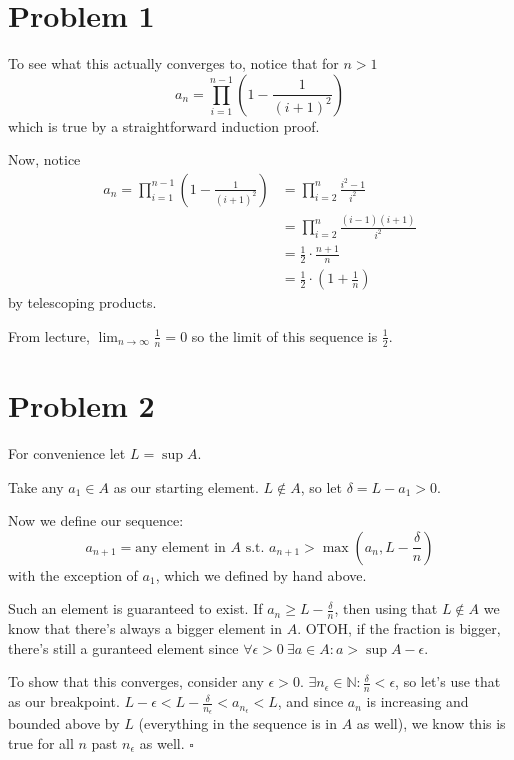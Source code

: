 \documentclass[12pt]{article}
\newcommand{\N}{\mathbb{N}}
\begin{document}
\section{Problem 1}

To see what this actually converges to, notice that for $n > 1$
\[a_n = \prod_{i=1}^{n-1} \left(1-\frac{1}{(i+1)^2}\right)\]
which is true by a straightforward induction proof.

Now, notice
\begin{align*}
  a_n
  =\prod_{i=1}^{n-1} \left(1-\frac{1}{(i+1)^2}\right)
   & = \prod_{i=2}^{n} \frac{i^2-1}{i^2}            \\
   & = \prod_{i=2}^{n} \frac{(i-1)(i+1)}{i^2}       \\
   & = \frac{1}{2} \cdot \frac{n+1}{n}              \\
   & = \frac{1}{2} \cdot \left(1+\frac{1}{n}\right)
\end{align*}
by telescoping products.

From lecture, $\lim_{n \to \infty} \frac{1}{n}=0$ so the limit of this sequence is $\boxed{\frac{1}{2}}$.
\section{Problem 2}

For convenience let $L=\sup A$.

Take any $a_1 \in A$ as our starting element.
$L \notin A$, so let $\delta = L-a_1 > 0$.

Now we define our sequence:
\[a_{n+1} = \text{any element in $A$ s.t. } a_{n+1} > \max\left(a_n, L - \frac{\delta}{n}\right)\]
with the exception of $a_1$, which we defined by hand above.

Such an element is guaranteed to exist.
If $a_n \ge L-\frac{\delta}{n}$, then using that $L \notin A$
we know that there's always a bigger element in $A$.
OTOH, if the fraction is bigger, there's still a guranteed element
since $\forall \epsilon > 0\ \exists a \in A: a > \sup A - \epsilon$.

To show that this converges, consider any $\epsilon > 0$.
$\exists n_\epsilon \in \N: \frac{\delta}{n} < \epsilon$,
so let's use that as our breakpoint.
$L - \epsilon < L-\frac{\delta}{n_\epsilon} < a_{n_\epsilon} < L$,
and since $a_n$ is increasing and bounded above by $L$ (everything in the sequence is in $A$ as well),
we know this is true for all $n$ past $n_\epsilon$ as well. $\square$

\pagebreak
\end{document}
